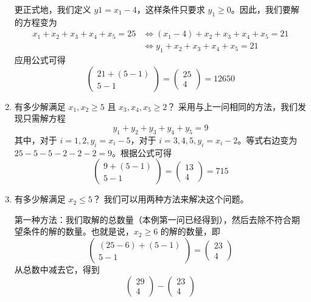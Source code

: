\begin{example}
\begin{enumerate}[label=(\arabic*)]
              更正式地，我们定义 $y1 = x_1 - 4$，这样条件只要求 $y_1 \ge 0$。因此，我们要解的方程变为
              \begin{align*}
                  x_1 + x_2 + x_3 + x_4 + x_5 = 25 & \iff (x_1-4) + x_2 + x_3 + x_4 + x_5 = 21 \\
                                                   & \iff y_1 + x_2 + x_3 + x_4 + x_5 = 21
              \end{align*}
              应用公式可得
              \[\begin{pmatrix}21+(5-1)\\5-1\end{pmatrix}=\begin{pmatrix}25\\4\end{pmatrix}=12650\]
        \item 有多少解满足 $x_1, x_2 \ge 5$ 且 $x_3, x_4, x_5 \ge 2$？
              采用与上一问相同的方法，我们发现只需解方程
              \[y_1 + y_2 + y_3 + y_4 + y_5 = 9\]
              其中，对于 $i=1,2, y_i = x_i-5$，对于 $i=3,4,5, y_i = x_i-2$。等式右边变为 $25 - 5 - 5 - 2 - 2 - 2 = 9$。根据公式可得
              \[\begin{pmatrix}9 +(5-1)\\5-1\end{pmatrix} = \begin{pmatrix}13\\4\end{pmatrix}=715\]
        \item 有多少解满足 $x_2 \le 5$？
              我们可以用两种方法来解决这个问题。

              第一种方法：我们取解的总数量（本例第一问已经得到），然后去除不符合期望条件的解的数量。也就是说，$x_2 \ge 6$ 的解的数量，即
              \[\begin{pmatrix}(25-6)+(5-1)\\5-1\end{pmatrix}=\begin{pmatrix}23\\4\end{pmatrix}\]
              从总数中减去它，得到
              \[\begin{pmatrix}29\\4\end{pmatrix}-\begin{pmatrix}23\\4\end{pmatrix}\] \\


\end{enumerate}
\end{example}
